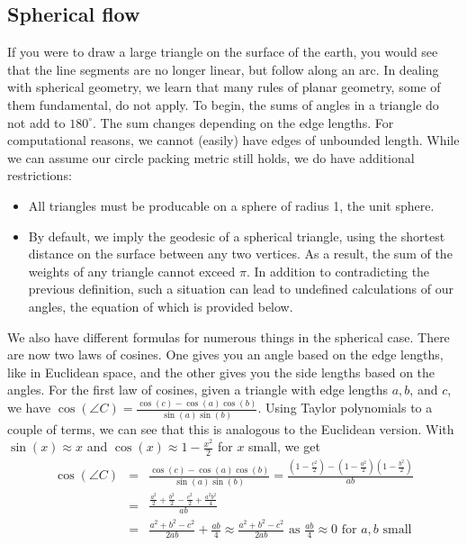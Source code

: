 \documentclass[12pt]{article}
\begin{document}
\subsection{Spherical flow}
If you were to draw a large triangle on the surface of the earth, you would see that the line segments are no longer linear, but follow along an arc. In dealing with spherical geometry, we learn that many rules of planar geometry, some of them fundamental, do not apply. To begin, the sums of angles in a triangle do not add to $180^\circ$. The sum changes depending on the edge lengths. For computational reasons, we cannot (easily) have edges of unbounded length. While we can assume our circle packing metric still holds, we do have additional restrictions: 

\begin{itemize}
\item All triangles must be producable on a sphere of radius 1, the unit sphere. 
\item By default, we imply the geodesic of a spherical triangle, using the shortest distance on the surface between any two vertices. As a result, the sum of the weights of any triangle cannot exceed $\pi.$ In addition to contradicting the previous definition, such a situation can lead to undefined calculations of our angles, the equation of which is provided below.
\end{itemize}

\noindent We also have different formulas for numerous things in the spherical case. There are now two laws of cosines. One gives you an angle based on the edge lengths, like in Euclidean space, and the other gives you the side lengths based on the angles. For the first law of cosines, given a triangle with edge lengths $a, b$, and $c$, we have $\cos(\angle C) = \frac{\cos(c) - \cos(a)\cos(b)}{\sin(a)\sin(b)}$. Using Taylor polynomials to a couple of terms, we can see that this is analogous to the Euclidean version. With $\sin(x) \approx x$ and $\cos(x) \approx 1 - \frac{x^2}{2}$ for $x$ small, we get 
\begin{eqnarray*}
\cos(\angle C) &=& \frac{\cos(c) - \cos(a)\cos(b)}{\sin(a)\sin(b)} = \frac{(1 - \frac{c^2}{2}) - (1 - \frac{a^2}{2})(1 - \frac{b^2}{2})}{ab}\\
							&=& \frac{\frac{a^2}{2} + \frac{b^2}{2} - \frac{c^2}{2} + \frac{a^2b^2}{4}}{ab}\\
							&=& \frac{a^2 + b^2 - c^2}{2ab} + \frac{ab}{4} \approx \frac{a^2 + b^2 - c^2}{2ab} \mbox{ as } \frac{ab}{4} \approx 0 \mbox{ for } a,b \mbox{ small}
\end{eqnarray*}
\end{document}
